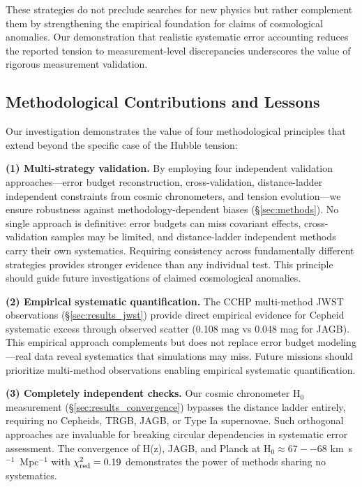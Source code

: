 \documentclass[preprint, linenumbers]{aastex701}
\begin{document}
These strategies do not preclude searches for new physics but rather complement them by strengthening the empirical foundation for claims of cosmological anomalies. Our demonstration that realistic systematic error accounting reduces the reported tension to measurement-level discrepancies underscores the value of rigorous measurement validation.

\subsection{Methodological Contributions and Lessons}

Our investigation demonstrates the value of four methodological principles that extend beyond the specific case of the Hubble tension:

\textbf{(1) Multi-strategy validation.} By employing four independent validation approaches---error budget reconstruction, cross-validation, distance-ladder independent constraints from cosmic chronometers, and tension evolution---we ensure robustness against methodology-dependent biases (\S\ref{sec:methods}). No single approach is definitive: error budgets can miss covariant effects, cross-validation samples may be limited, and distance-ladder independent methods carry their own systematics. Requiring consistency across fundamentally different strategies provides stronger evidence than any individual test. This principle should guide future investigations of claimed cosmological anomalies.

\textbf{(2) Empirical systematic quantification.} The CCHP multi-method JWST observations (\S\ref{sec:results_jwst}) provide direct empirical evidence for Cepheid systematic excess through observed scatter (0.108 mag vs 0.048 mag for JAGB). This empirical approach complements but does not replace error budget modeling---real data reveal systematics that simulations may miss. Future missions should prioritize multi-method observations enabling empirical systematic quantification.

\textbf{(3) Completely independent checks.} Our cosmic chronometer H$_0$ measurement (\S\ref{sec:results_convergence}) bypasses the distance ladder entirely, requiring no Cepheids, TRGB, JAGB, or Type Ia supernovae. Such orthogonal approaches are invaluable for breaking circular dependencies in systematic error assessment. The convergence of H(z), JAGB, and Planck at H$_0 \approx 67--68$ km~s$^{-1}$~Mpc$^{-1}$ with $\chi^2_{\rm red} = 0.19$ demonstrates the power of methods sharing no systematics.
\end{document}
